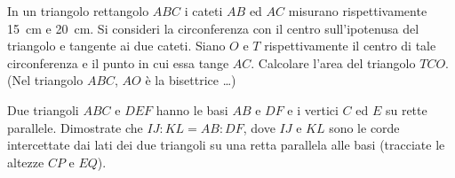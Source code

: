 \begin{multicols}{2}
% 
% 
\begin{esercizio}
\label{ese:6.89}
In un triangolo rettangolo $ABC$ i cateti $AB$ ed $AC$ misurano 
rispettivamente 15~cm e 20~cm. Si consideri la circonferenza con il 
centro sull'ipotenusa del triangolo e tangente ai due cateti. Siano 
$O$ e $T$ rispettivamente il centro di tale circonferenza e il punto 
in cui essa tange $AC$. Calcolare l'area del triangolo $TCO$. (Nel 
triangolo $ABC$, $AO$ è la bisettrice \ldots)
\end{esercizio}


\end{multicols}

\noindent\begin{minipage}{.4\textwidth}
\begin{esercizio}
\label{ese:6.86}
Due triangoli $ABC$ e $DEF$ hanno le basi 
$AB$ e $DF$ e i vertici $C$ ed $E$ su rette parallele. Dimostrate che 
$IJ:KL=AB:DF$, dove $IJ$ e $KL$ sono le corde intercettate dai lati 
dei due triangoli su una retta parallela alle basi (tracciate le 
altezze $CP$ e $EQ$).
\end{esercizio}
\end{minipage}
\begin{minipage}{.6\textwidth}
\begin{inaccessibleblock}
 \begin{center}  \end{center}
\end{inaccessibleblock}
\end{minipage}

